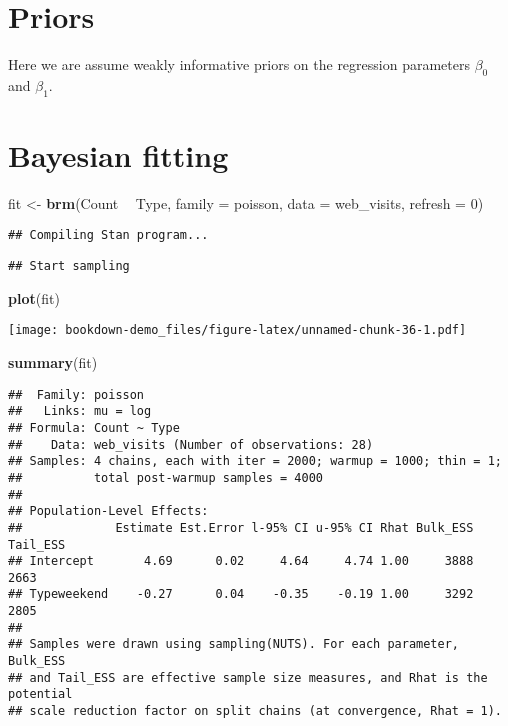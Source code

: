 \documentclass[
]{book}
\newenvironment{Shaded}{\begin{snugshade}}{\end{snugshade}}
\newcommand{\DataTypeTok}[1]{\textcolor[rgb]{0.13,0.29,0.53}{#1}}
\newcommand{\DecValTok}[1]{\textcolor[rgb]{0.00,0.00,0.81}{#1}}
\newcommand{\KeywordTok}[1]{\textcolor[rgb]{0.13,0.29,0.53}{\textbf{#1}}}
\newcommand{\NormalTok}[1]{#1}
\newcommand{\OperatorTok}[1]{\textcolor[rgb]{0.81,0.36,0.00}{\textbf{#1}}}
\newcommand{\StringTok}[1]{\textcolor[rgb]{0.31,0.60,0.02}{#1}}
\begin{document}
\hypertarget{priors}{%
\section{Priors}\label{priors}}

Here we are assume weakly informative priors on the regression parameters \(\beta_0\) and \(\beta_1\).

\hypertarget{bayesian-fitting}{%
\section{Bayesian fitting}\label{bayesian-fitting}}

\begin{Shaded}
\begin{Highlighting}[]
\NormalTok{fit <-}\StringTok{ }\KeywordTok{brm}\NormalTok{(Count }\OperatorTok{~}\StringTok{ }\NormalTok{Type,}
           \DataTypeTok{family =}\NormalTok{ poisson,}
           \DataTypeTok{data =}\NormalTok{ web_visits,}
           \DataTypeTok{refresh =} \DecValTok{0}\NormalTok{)}
\end{Highlighting}
\end{Shaded}

\begin{verbatim}
## Compiling Stan program...
\end{verbatim}

\begin{verbatim}
## Start sampling
\end{verbatim}

\begin{Shaded}
\begin{Highlighting}[]
\KeywordTok{plot}\NormalTok{(fit)}
\end{Highlighting}
\end{Shaded}

\texttt{[image: bookdown-demo\_files/figure-latex/unnamed-chunk-36-1.pdf]}

\begin{Shaded}
\begin{Highlighting}[]
\KeywordTok{summary}\NormalTok{(fit)}
\end{Highlighting}
\end{Shaded}

\begin{verbatim}
##  Family: poisson 
##   Links: mu = log 
## Formula: Count ~ Type 
##    Data: web_visits (Number of observations: 28) 
## Samples: 4 chains, each with iter = 2000; warmup = 1000; thin = 1;
##          total post-warmup samples = 4000
## 
## Population-Level Effects: 
##             Estimate Est.Error l-95% CI u-95% CI Rhat Bulk_ESS Tail_ESS
## Intercept       4.69      0.02     4.64     4.74 1.00     3888     2663
## Typeweekend    -0.27      0.04    -0.35    -0.19 1.00     3292     2805
## 
## Samples were drawn using sampling(NUTS). For each parameter, Bulk_ESS
## and Tail_ESS are effective sample size measures, and Rhat is the potential
## scale reduction factor on split chains (at convergence, Rhat = 1).
\end{verbatim}
\end{document}
